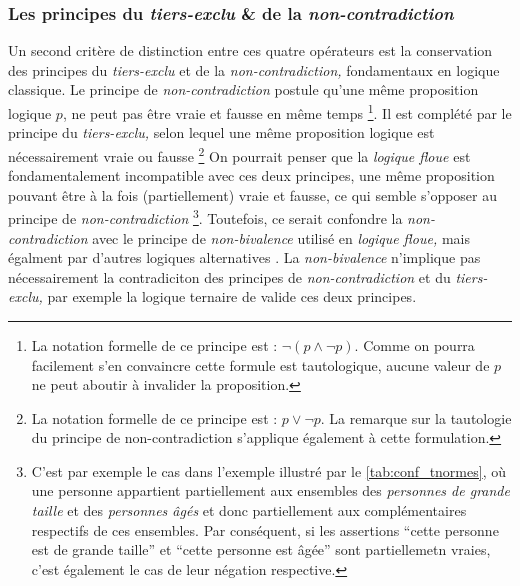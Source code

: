 

\subsubsection{Les principes du \emph{tiers-exclu} \& de la
  \emph{non-contradiction}}

Un second critère de distinction entre ces quatre opérateurs est la
conservation des principes du \emph{tiers-exclu} et de la
\emph{non-contradiction,} fondamentaux en logique classique. Le
principe de \emph{non-contradiction} postule qu'une même proposition
logique \(p\), ne peut pas être vraie et fausse en même temps
\footnote{La notation formelle de ce principe est :
  \(\neg(p \wedge \neg p) \). Comme on pourra facilement s'en
  convaincre cette formule est tautologique, aucune valeur de \(p\) ne
  peut aboutir à invalider la proposition.}. Il est complété par le
principe du \emph{tiers-exclu,} selon lequel une même proposition
logique est nécessairement vraie ou fausse \footnote{La notation
  formelle de ce principe est : \(p \vee \neg p\). La remarque sur la
  tautologie du principe de non-contradiction s'applique également à
  cette formulation.} On pourrait penser que la \emph{logique floue}
est fondamentalement incompatible avec ces deux principes, une même
proposition pouvant être à la fois (partiellement) vraie et fausse, ce
qui semble s'opposer au principe de \emph{non-contradiction}
\footnote{C'est par exemple le cas dans l'exemple illustré par le
  \autoref{tab:conf_tnormes}, où une personne appartient partiellement
  aux ensembles des \emph{personnes de grande taille} et des
  \emph{personnes âgés} et donc partiellement aux complémentaires
  respectifs de ces ensembles. Par conséquent, si les assertions
  \enquote{cette personne est de grande taille} et \enquote{cette
    personne est âgée} sont partiellemetn vraies, c'est également le
  cas de leur négation respective.}. Toutefois, ce serait confondre la
\emph{non-contradiction} avec le principe de \emph{non-bivalence}
utilisé en \emph{logique floue,} mais égalment par d'autres logiques
alternatives \autocite{Gottwald2020}. La \emph{non-bivalence}
n'implique pas nécessairement la contradiciton des principes de
\emph{non-contradiction} et du \emph{tiers-exclu,} par exemple la
logique ternaire de  valide ces deux principes.



